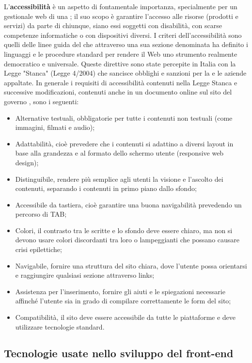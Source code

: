 L'\textbf{accessibilità} è un aspetto di fontamentale importanza, specialmente per un gestionale web di una ; il suo scopo è garantire l'accesso alle risorse (prodotti e servizi) da parte di chiunque, siano essi soggetti con disabilità, con scarse competenze informatiche o con dispositivi diversi.
I criteri dell'accessibilità sono quelli delle linee guida del  che attraverso una sua sezione denominata  ha definito i linguaggi e le procedure standard per rendere il Web uno strumento realmente democratico e universale.
Queste direttive sono state percepite in Italia con la Legge "Stanca" (Legge 4/2004) che sancisce obblighi e sanzioni per la  e le aziende appaltate.
In generale i requisiti di accessibilità contenuti nella Legge Stanca e successive modificazioni, contenuti anche in un documento online sul sito del governo , sono i seguenti:
\begin{itemize}
    \item Alternative testuali, obbligatorie per tutte i contenuti non testuali (come immagini, filmati e audio);
    \item Adattabilità, cioè prevedere che i contenuti si adattino a diversi layout in base alla grandezza e al formato dello schermo utente (responsive web design);
    \item Distinguibile, rendere più semplice agli utenti la visione e l'ascolto dei contenuti, separando i contenuti in primo piano dallo sfondo;
    \item Accessibile da tastiera, cioè garantire una buona navigabilità prevedendo un percorso di TAB;
    \item Colori, il contrasto tra le scritte e lo sfondo deve essere chiaro, ma non si devono usare colori discordanti tra loro o lampeggianti che possano causare crisi epilettiche;
    \item Navigabile, fornire una struttura del sito chiara, dove l'utente possa orientarsi e raggiungire qualsiasi sezione attraverso links;
    \item Assistenza per l'inserimento, fornire gli aiuti e le spiegazioni necessarie affinché l'utente sia in grado di compilare correttamente le form del sito;
    \item Compatibilità, il sito deve essere accessibile da tutte le piattaforme e deve utilizzare tecnologie standard.
\end{itemize}


\subsection{Tecnologie usate nello sviluppo del front-end}

